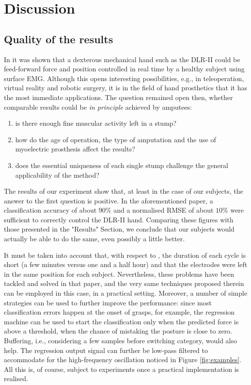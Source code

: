 \section{Discussion}
\label{sec:disc}

\subsection{Quality of the results}

In \cite{2008.BioCyb} it was shown that a dexterous mechanical hand such as
the DLR-II could be feed-forward force and position controlled in
real time by a healthy subject using surface EMG. Although this opens
interesting possibilities, e.g., in teleoperation, virtual reality
and robotic surgery, it is in the field of hand prosthetics that it has the
most immediate applications. The question remained open then, whether comparable
results could be \emph{in principle} achieved by amputees:

\begin{enumerate}

  \item is there enough fine muscular activity left in a stump?
  \item how do the age of operation, the type of
	amputation and the use of myoelectric prosthesis affect the results?
  \item does the essential uniqueness of each single stump challenge the
  	general applicability of the method?

\end{enumerate}

The results of our experiment show that, at least in the case of our subjects, the
answer to the first question is positive. In the aforementioned paper, a classification
accuracy of about $90\%$ and a normalised RMSE of about $10\%$ were sufficient to
correctly control the DLR-II hand. Comparing these figures with those presented in the
"Results" Section, we conclude that our subjects would actually be able to
do the same, even possibly a little better. 

It must be taken into account that, with respect to \cite{2008.BioCyb},
the duration of each cycle is short (a few minutes versus one and a half hour)
and that the electrodes were left in the same position for each subject. Nevertheless,
these problems have been tackled and solved in that paper, and the very same
techniques proposed therein can be employed in this case, in a practical setting.
Moreover, a number of simple strategies can be used to further improve the
performance: since most classification errors happen at the onset
of grasps, for example, the regression machine can be used to start the classification only
when the predicted force is above a threshold, when the chance of mistaking the
posture is close to zero. Buffering, i.e., considering a few samples before
switching category, would also help. The regression output
signal can further be low-pass filtered to accommodate for the high-frequency oscillation
noticed in Figure \ref{fig:examples}. All this is, of course, subject to experiments
once a practical implementation is realised.

